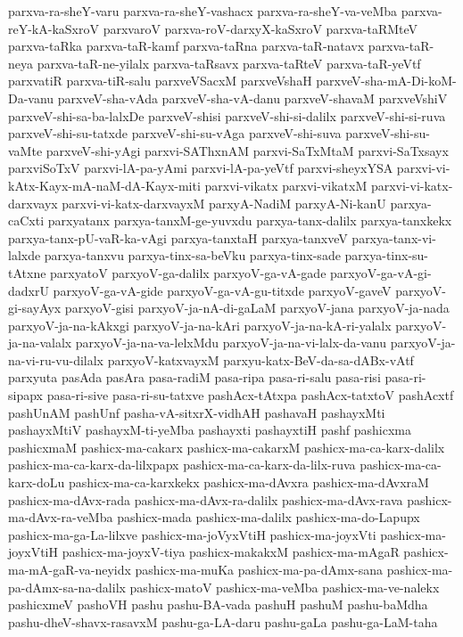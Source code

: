 {parxva-ra-sheY-varu
parxva-ra-sheY-vashacx
parxva-ra-sheY-va-veMba
parxva-reY-kA-kaSxroV
parxvaroV
parxva-roV-darxyX-kaSxroV
parxva-taRMteV
parxva-taRka
parxva-taR-kamf
parxva-taRna
parxva-taR-natavx
parxva-taR-neya
parxva-taR-ne-yilalx
parxva-taRsavx
parxva-taRteV
parxva-taR-yeVtf
parxvatiR
parxva-tiR-salu
parxveVSacxM
parxveVshaH
parxveV-sha-mA-Di-koM-Da-vanu
parxveV-sha-vAda
parxveV-sha-vA-danu
parxveV-shavaM
parxveVshiV
parxveV-shi-sa-ba-lalxDe
parxveV-shisi
parxveV-shi-si-dalilx
parxveV-shi-si-ruva
parxveV-shi-su-tatxde
parxveV-shi-su-vAga
parxveV-shi-suva
parxveV-shi-su-vaMte
parxveV-shi-yAgi
parxvi-SAThxnAM
parxvi-SaTxMtaM
parxvi-SaTxsayx
parxviSoTxV
parxvi-lA-pa-yAmi
parxvi-lA-pa-yeVtf
parxvi-sheyxYSA
parxvi-vi-kAtx-Kayx-mA-naM-dA-Kayx-miti
parxvi-vikatx
parxvi-vikatxM
parxvi-vi-katx-darxvayx
parxvi-vi-katx-darxvayxM
parxyA-NadiM
parxyA-Ni-kanU
parxya-caCxti
parxyatanx
parxya-tanxM-ge-yuvxdu
parxya-tanx-dalilx
parxya-tanxkekx
parxya-tanx-pU-vaR-ka-vAgi
parxya-tanxtaH
parxya-tanxveV
parxya-tanx-vi-lalxde
parxya-tanxvu
parxya-tinx-sa-beVku
parxya-tinx-sade
parxya-tinx-su-tAtxne
parxyatoV
parxyoV-ga-dalilx
parxyoV-ga-vA-gade
parxyoV-ga-vA-gi-dadxrU
parxyoV-ga-vA-gide
parxyoV-ga-vA-gu-titxde
parxyoV-gaveV
parxyoV-gi-sayAyx
parxyoV-gisi
parxyoV-ja-nA-di-gaLaM
parxyoV-jana
parxyoV-ja-nada
parxyoV-ja-na-kAkxgi
parxyoV-ja-na-kAri
parxyoV-ja-na-kA-ri-yalalx
parxyoV-ja-na-valalx
parxyoV-ja-na-va-lelxMdu
parxyoV-ja-na-vi-lalx-da-vanu
parxyoV-ja-na-vi-ru-vu-dilalx
parxyoV-katxvayxM
parxyu-katx-BeV-da-sa-dABx-vAtf
parxyuta
pasAda
pasAra
pasa-radiM
pasa-ripa
pasa-ri-salu
pasa-risi
pasa-ri-sipapx
pasa-ri-sive
pasa-ri-su-tatxve
pashAcx-tAtxpa
pashAcx-tatxtoV
pashAcxtf
pashUnAM
pashUnf
pasha-vA-sitxrX-vidhAH
pashavaH
pashayxMti
pashayxMtiV
pashayxM-ti-yeMba
pashayxti
pashayxtiH
pashf
pashicxma
pashicxmaM
pashicx-ma-cakarx
pashicx-ma-cakarxM
pashicx-ma-ca-karx-dalilx
pashicx-ma-ca-karx-da-lilxpapx
pashicx-ma-ca-karx-da-lilx-ruva
pashicx-ma-ca-karx-doLu
pashicx-ma-ca-karxkekx
pashicx-ma-dAvxra
pashicx-ma-dAvxraM
pashicx-ma-dAvx-rada
pashicx-ma-dAvx-ra-dalilx
pashicx-ma-dAvx-rava
pashicx-ma-dAvx-ra-veMba
pashicx-mada
pashicx-ma-dalilx
pashicx-ma-do-Lapupx
pashicx-ma-ga-La-lilxve
pashicx-ma-joVyxVtiH
pashicx-ma-joyxVti
pashicx-ma-joyxVtiH
pashicx-ma-joyxV-tiya
pashicx-makakxM
pashicx-ma-mAgaR
pashicx-ma-mA-gaR-va-neyidx
pashicx-ma-muKa
pashicx-ma-pa-dAmx-sana
pashicx-ma-pa-dAmx-sa-na-dalilx
pashicx-matoV
pashicx-ma-veMba
pashicx-ma-ve-nalekx
pashicxmeV
pashoVH
pashu
pashu-BA-vada
pashuH
pashuM
pashu-baMdha
pashu-dheV-shavx-rasavxM
pashu-ga-LA-daru
pashu-gaLa
pashu-ga-LaM-taha
}
